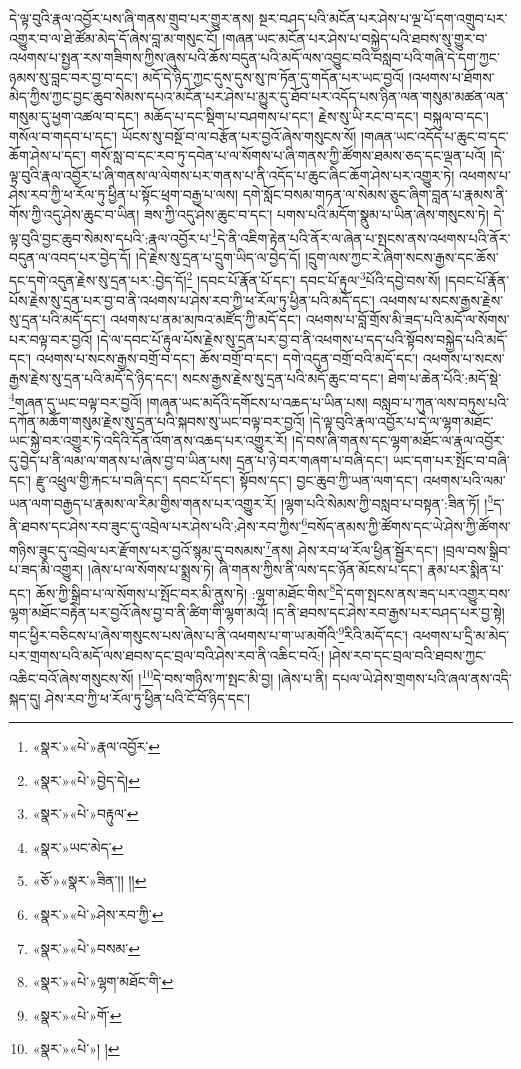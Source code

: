 དེ་ལྟ་བུའི་རྣལ་འབྱོར་པས་ཞི་གནས་གྲུབ་པར་གྱུར་ནས། སྔར་བཤད་པའི་མངོན་པར་ཤེས་པ་ལྔ་པོ་དག་འགྲུབ་པར་འགྱུར་བ་ལ་ཐེ་ཚོམ་མེད་དོ་ཞེས་བླ་མ་གསུང་ངོ། །གཞན་ཡང་མངོན་པར་ཤེས་པ་བསྐྱེད་པའི་ཐབས་སུ་གྱུར་བ་འཕགས་པ་སྤྱན་རས་གཟིགས་ཀྱིས་ཞུས་པའི་ཆོས་བདུན་པའི་མདོ་ལས་འབྱུང་བའི་བསླབ་པའི་གཞི་དེ་དག་ཀྱང་ཉམས་སུ་བླང་བར་བྱ་བ་དང་། མདོ་དེ་ཉིད་ཀྱང་དུས་དུས་སུ་ཁ་ཏོན་དུ་གདོན་པར་ཡང་བྱའོ། །འཕགས་པ་ཐོགས་མེད་ཀྱིས་ཀྱང་བྱང་ཆུབ་སེམས་དཔའ་མངོན་པར་ཤེས་པ་མྱུར་དུ་ཐོབ་པར་འདོད་པས་ཉིན་ལན་གསུམ་མཚན་ལན་གསུམ་དུ་ཕྱག་འཚལ་བ་དང་། མཆོད་པ་དང་སྡིག་པ་བཤགས་པ་དང་། རྗེས་སུ་ཡི་རང་བ་དང་། བསྐུལ་བ་དང་། གསོལ་བ་གདབ་པ་དང་། ཡོངས་སུ་བསྔོ་བ་ལ་བརྩོན་པར་བྱའོ་ཞེས་གསུངས་སོ། །གཞན་ཡང་འདོད་པ་ཆུང་བ་དང་ཆོག་ཤེས་པ་དང་། གསོ་སླ་བ་དང་རབ་ཏུ་དབེན་པ་ལ་སོགས་པ་ཞི་གནས་ཀྱི་ཚོགས་ཐམས་ཅད་དང་ལྡན་པའོ། །དེ་ལྟ་བུའི་རྣལ་འབྱོར་པ་ཞི་གནས་ལ་ལེགས་པར་གནས་པ་ནི་འདོད་པ་ཆུང་ཞིང་ཆོག་ཤེས་པར་འགྱུར་ཏེ། འཕགས་པ་ཤེས་རབ་ཀྱི་ཕ་རོལ་ཏུ་ཕྱིན་པ་སྟོང་ཕྲག་བརྒྱ་པ་ལས། དགེ་སློང་བསམ་གཏན་ལ་སེམས་ཅུང་ཞིག་བླན་པ་རྣམས་ནི་གོས་ཀྱི་འདུ་ཤེས་ཆུང་བ་ཡིན། ཟས་ཀྱི་འདུ་ཤེས་ཆུང་བ་དང་། པགས་པའི་མདོག་སྣུམ་པ་ཡིན་ཞེས་གསུངས་ཏེ། དེ་ལྟ་བུའི་བྱང་ཆུབ་སེམས་དཔའི་:རྣལ་འབྱོར་པ་\footnote{«སྣར་»«པེ་»རྣལ་འབྱོར་}དེ་ནི་འཇིག་རྟེན་པའི་ནོར་ལ་ཞེན་པ་སྤངས་ནས་འཕགས་པའི་ནོར་བདུན་ལ་འབད་པར་བྱེད་དོ། །དེ་རྗེས་སུ་དྲན་པ་དྲུག་ཡིད་ལ་བྱེད་དོ། །དྲུག་ལས་ཀྱང་རེ་ཞིག་སངས་རྒྱས་དང་ཆོས་དང་དགེ་འདུན་རྗེས་སུ་དྲན་པར་:བྱེད་དོ།\footnote{«སྣར་»«པེ་»བྱེད་དེ།} །དབང་པོ་རྣོན་པོ་དང་། དབང་པོ་རྟུལ་\footnote{«སྣར་»«པེ་»བརྟུལ་}པོའི་དབྱེ་བས་སོ། །དབང་པོ་རྣོན་པོས་རྗེས་སུ་དྲན་པར་བྱ་བ་ནི་འཕགས་པ་ཤེས་རབ་ཀྱི་ཕ་རོལ་ཏུ་ཕྱིན་པའི་མདོ་དང་། འཕགས་པ་སངས་རྒྱས་རྗེས་སུ་དྲན་པའི་མདོ་དང་། འཕགས་པ་ནམ་མཁའ་མཛོད་ཀྱི་མདོ་དང་། འཕགས་པ་བློ་གྲོས་མི་ཟད་པའི་མདོ་ལ་སོགས་པར་བལྟ་བར་བྱའོ། །དེ་ལ་དབང་པོ་རྟུལ་པོས་རྗེས་སུ་དྲན་པར་བྱ་བ་ནི་འཕགས་པ་དད་པའི་སྟོབས་བསྐྱེད་པའི་མདོ་དང་། འཕགས་པ་སངས་རྒྱས་བགྲོ་བ་དང་། ཆོས་བགྲོ་བ་དང་། དགེ་འདུན་བགྲོ་བའི་མདོ་དང་། འཕགས་པ་སངས་རྒྱས་རྗེས་སུ་དྲན་པའི་མདོ་དེ་ཉིད་དང་། སངས་རྒྱས་རྗེས་སུ་དྲན་པའི་མདོ་ཆུང་བ་དང་། ཐེག་པ་ཆེན་པོའི་:མདོ་སྡེ་\footnote{«སྣར་»ཡང་མེད་}གཞན་དུ་ཡང་བལྟ་བར་བྱའོ། །གཞན་ཡང་མདོའི་དགོངས་པ་འཆད་པ་ཡིན་པས། བསླབ་པ་ཀུན་ལས་བཏུས་པའི་དཀོན་མཆོག་གསུམ་རྗེས་སུ་དྲན་པའི་སྐབས་སུ་ཡང་བལྟ་བར་བྱའོ། །དེ་ལྟ་བུའི་རྣལ་འབྱོར་པ་དེ་ལ་ལྷག་མཐོང་ཡང་སྐྱེ་བར་འགྱུར་ཏེ་འདིའི་དོན་འོག་ནས་འཆད་པར་འགྱུར་རོ། །དེ་བས་ཞི་གནས་དང་ལྷག་མཐོང་ལ་རྣལ་འབྱོར་དུ་བྱེད་པ་ནི་ལམ་ལ་གནས་པ་ཞེས་བྱ་བ་ཡིན་པས། དྲན་པ་ཉེ་བར་གཞག་པ་བཞི་དང་། ཡང་དག་པར་སྤོང་བ་བཞི་དང་། རྫུ་འཕྲུལ་གྱི་རྐང་པ་བཞི་དང་། དབང་པོ་དང་། སྟོབས་དང་། བྱང་ཆུབ་ཀྱི་ཡན་ལག་དང་། འཕགས་པའི་ལམ་ཡན་ལག་བརྒྱད་པ་རྣམས་ལ་རིམ་གྱིས་གནས་པར་འགྱུར་རོ། །ལྷག་པའི་སེམས་ཀྱི་བསླབ་པ་བསྟན་:ཟིན་ཏོ། །\footnote{«ཅོ་»«སྣར་»ཟིན་།། །།}ད་ནི་ཐབས་དང་ཤེས་རབ་ཟུང་དུ་འབྲེལ་པར་ཤེས་པའི་:ཤེས་རབ་ཀྱིས་\footnote{«སྣར་»«པེ་»ཤེས་རབ་ཀྱི་}བསོད་ནམས་ཀྱི་ཚོགས་དང་ཡེ་ཤེས་ཀྱི་ཚོགས་གཉིས་ཟུང་དུ་འབྲེལ་པར་རྫོགས་པར་བྱའོ་སྙམ་དུ་བསམས་\footnote{«སྣར་»«པེ་»བསམ་}ནས། ཤེས་རབ་ཕ་རོལ་ཕྱིན་སྦྱོར་དང་། །བྲལ་བས་སྒྲིབ་པ་ཟད་མི་འགྱུར། །ཞེས་པ་ལ་སོགས་པ་སྨྲས་ཏེ། ཞི་གནས་ཀྱིས་ནི་ལས་དང་ཉོན་མོངས་པ་དང་། རྣམ་པར་སྨིན་པ་དང་། ཆོས་ཀྱི་སྒྲིབ་པ་ལ་སོགས་པ་སྤོང་བར་མི་ནུས་ཏེ། :ལྷག་མཐོང་གིས་\footnote{«སྣར་»«པེ་»ལྷག་མཐོང་གི་}དེ་དག་སྤངས་ནས་ཟད་པར་འགྱུར་བས་ལྷག་མཐོང་བརྟེན་པར་བྱའོ་ཞེས་བྱ་བ་ནི་ཚིག་གི་ལྷག་མའོ། །ད་ནི་ཐབས་དང་ཤེས་རབ་རྒྱས་པར་བཤད་པར་བྱ་སྟེ། གང་ཕྱིར་བཅིངས་པ་ཞེས་གསུངས་པས་ཞེས་པ་ནི་འཕགས་པ་ག་ཡ་མགོའི་\footnote{«སྣར་»«པེ་»གོ་}རིའི་མདོ་དང་། འཕགས་པ་དྲི་མ་མེད་པར་གྲགས་པའི་མདོ་ལས་ཐབས་དང་བྲལ་བའི་ཤེས་རབ་ནི་འཆིང་བའོ:། །ཤེས་རབ་དང་བྲལ་བའི་ཐབས་ཀྱང་འཆིང་བའོ་ཞེས་གསུངས་སོ། །\footnote{«སྣར་»«པེ་»། །}དེ་བས་གཉིས་ཀ་སྤང་མི་བྱ། །ཞེས་པ་ནི། དཔལ་ཡེ་ཤེས་གྲགས་པའི་ཞལ་ནས་འདི་སྐད་དུ། ཤེས་རབ་ཀྱི་ཕ་རོལ་ཏུ་ཕྱིན་པའི་ངོ་བོ་ཉིད་དང་། 